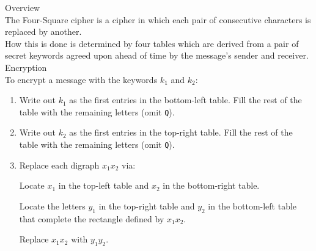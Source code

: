 \begin{minipage}{6cm}\raggedright
\textsf{\LARGE Overview}\\[1.0ex]

The Four-Square cipher is a cipher in which each pair of consecutive characters is replaced by another.\\[1.25ex]


How this is done is determined by four tables which are derived from a pair of secret keywords agreed upon ahead of time by the message's sender and receiver.\\[3ex] 

\textsf{\LARGE Encryption}\\[1.0ex]

To encrypt a message with the keywords $k_1$ and $k_2$:
\begin{enumerate}[leftmargin=*]
	\item Write out $k_1$ as the first entries in the bottom-left  table. Fill the rest of the table with the remaining letters (omit \texttt{Q}).\\[1.25ex]
	\item Write out $k_2$ as the first entries in the top-right table. Fill the rest of the table with the remaining letters (omit \texttt{Q}).\\[1.25ex]
	\item Replace each digraph $x_1x_2$ via:
	
	Locate $x_1$ in the top-left table and $x_2$ in the bottom-right table.
	
	Locate the letters $y_1$ in the top-right table and $y_2$ in the bottom-left table that complete the rectangle defined by $x_1x_2$.
	
	Replace $x_1x_2$ with $y_1y_2$.
\end{enumerate}
%
%
%
%
%
%
\end{minipage}